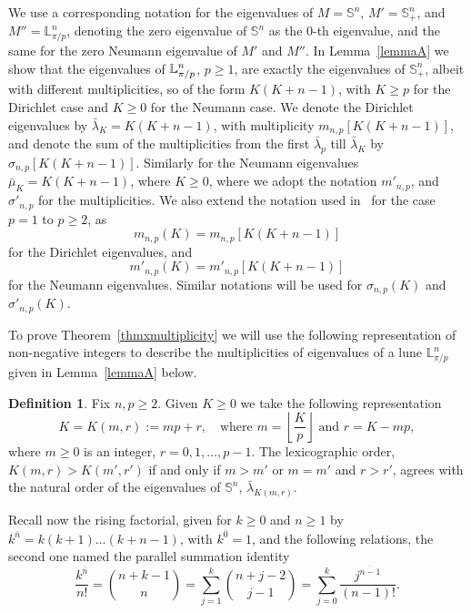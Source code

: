 \documentclass[11pt,a4paper,times]{amsart}
\theoremstyle{plain}
\theoremstyle{definition}
\newtheorem{definition}[thm]{Definition}%
\numberwithin{equation}{section}
\newcommand{\ds}{\displaystyle}
\newcommand{\dsum}{\ds\sum}
\newcommand{\Se}{\mathbb{S}}
\newcommand{\fr}[2]{\frac{\ds #1}{\ds #2}}
\newcommand{\lune}[2]{\mathbb{L}^{#1}_{#2}}
\newcommand{\luned}[2]{\raisebox{0.5pt}{${}$}\mathbb{L}^{#1}_{\pi/#2}}
\newcommand{\txtg}{\textcolor{green}}
\begin{document}
{  We use a corresponding notation for the eigenvalues of $M=\mathbb{S}^n$, $M'=\mathbb{S}_+^n$,  and $M''=\lune{n}{\pi/p}$, denoting
  the zero eigenvalue of $\mathbb{S}^n$ as the $0$-th eigenvalue, and the same for the zero Neumann eigenvalue of $M'$ and $M''$. 
  In Lemma~\ref{lemmaA} we show that the  eigenvalues of $\luned{n}{p}$, $p\geq 1$, are exactly the eigenvalues of $\mathbb{S}_+^n$,
  albeit with different multiplicities, so of the form $K(K+n-1)$, with $K\geq p$ for the Dirichlet case and $K\geq 0$ for the Neumann
  case. We denote the Dirichlet eigenvalues by $\bar{\lambda}_{K}=K(K+n-1)$,  with multiplicity $m_{n,p}[K(K+n-1)]$, and denote the  sum of the multiplicities from the first $\bar{\lambda}_p$  till $\bar{\lambda}_K$
  by $\sigma_{n,p}[K(K+n-1)]$. Similarly for the  Neumann eigenvalues $\bar{\mu}_{K}=K(K+n-1)$, where $K\geq 0$, where
  we adopt the notation $m'_{n,p}$, and $\sigma'_{n,p}$ for the multiplicities. We also extend the notation used
  in~\cite{fms} for the case $p=1$ to $p\geq 2$, as
\[
 m_{n,p}(K)=m_{n,p}[K(K+n-1)]
\]
for the Dirichlet eigenvalues, and
\[
 m'_{n,p}(K)=m'_{n,p}[K(K+n-1)]
\]
for the Neumann eigenvalues. Similar notations will be used for $\sigma_{n,p}(K)$ and $\sigma'_{n,p}(K)$.

{To prove Theorem~\ref{thmxmultiplicity} we will use the following representation of non-negative integers to describe the
multiplicities of eigenvalues of a lune $\lune{n}{\pi/p}$ given in Lemma~\ref{lemmaA} below.}
\begin{definition}
Fix $n,p\geq 2$. Given $K\geq 0$ we take the following representation 
 \begin{equation}\label{K(m,r)}
 K=K(m,r):=mp+r,  \quad \mbox{where~} m=\left\lfloor \frac{K}{p}\right\rfloor
 \mbox{~and~} r=K-mp, 
 \end{equation}
 where $m\geq 0$ is an integer, $r=0, 1, \ldots, p-1$. 
 The lexicographic order,
$K(m,r)> K(m',r')$ if and only if $m>m'$ or $m=m'$ and $r>r'$,
agrees with the natural order of the eigenvalues of $\Se^n$,  
$\bar{\lambda}_{K(m,r)}$.
 \end{definition}
%

Recall now the rising factorial, given for $k\geq 0$ and $n\geq 1$ by
$k^{\bar{n}}=k(k+1)\ldots (k+n-1)$, with $k^{\bar{0}}=1$, and the following relations,
the second one named the parallel summation identity
\begin{equation}\label{parallelsum}
\fr{k^{\overline{n}}}{n!}=\binom{n+k-1}{n} = \dsum_{j=1}^{k}\binom{n+j-2}{j-1} = \dsum_{j=0}^{k}\frac{j^{\overline{n-1}}}{(n-1)!}.
\end{equation}

}
\end{document}

